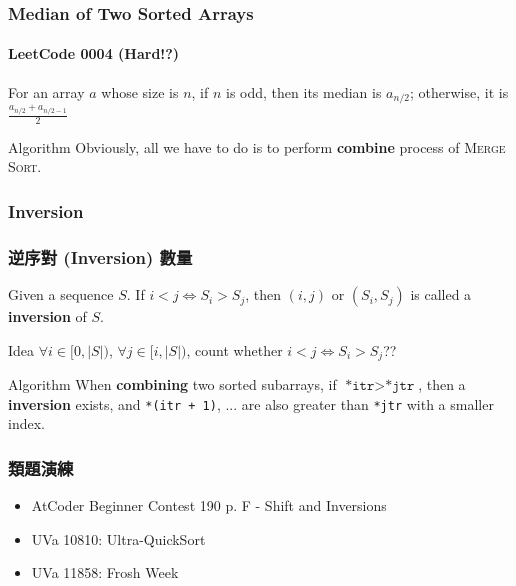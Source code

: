 \documentclass{beamer}
\begin{document}
\frame
{
	\frametitle{Median of Two Sorted Arrays}
	\framesubtitle{LeetCode 0004 (Hard!?)}
	
	\begin{definition}[Median]
		For an array $a$ whose size is $n$, if $n$ is odd, then its median is $a_{n/ 2}$; otherwise, it is $\frac{a_{n/2} + a_{n/2 - 1}}{2}$
	\end{definition}
	\pause
	
	\begin{block}{Algorithm}
		Obviously, all we have to do is to perform \textbf{combine} process of \textsc{Merge Sort}.
	\end{block}
}

\subsubsection{Inversion}

\frame
{
	\frametitle{逆序對 (Inversion) 數量}
	
	\begin{definition}[Inversion]
		Given a sequence $S$. If $i < j \iff S_i > S_j$, then $(i, j)$ or $(S_i, S_j)$ is called a \textbf{inversion} of $S$.
	\end{definition}
	\pause
	
	\begin{block}{Idea}
		$\forall i \in [0, |S|)$, $\forall j \in [i, |S|)$, count whether $i < j \iff S_i > S_j$??
	\end{block}
	\pause
	
	\begin{block}{Algorithm}
		When \textbf{combining} two sorted subarrays, if $\texttt{*itr} > \texttt{*jtr}$, then a \textbf{inversion} exists, and \texttt{*(itr + 1)}, ... are also greater than \texttt{*jtr} with a smaller index.
	\end{block}
}

\frame
{
	\frametitle{類題演練}
	
	\begin{itemize}
		\item AtCoder Beginner Contest 190 p. F - Shift and Inversions
		\item UVa 10810: Ultra-QuickSort
		\item UVa 11858: Frosh Week
	\end{itemize}
}
\end{document}
